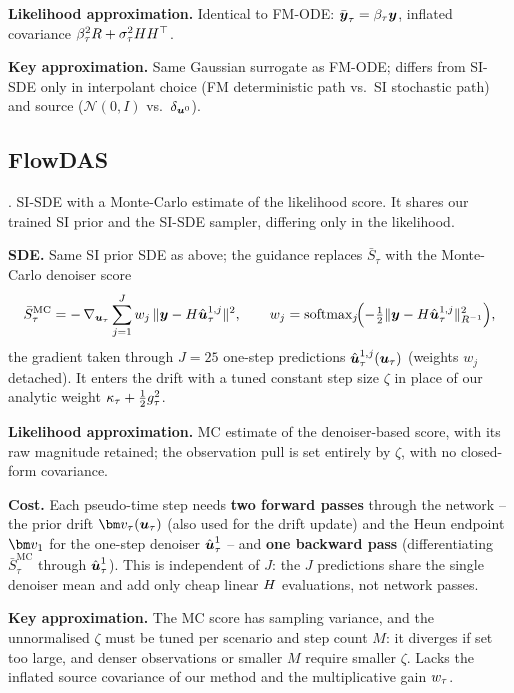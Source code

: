 \textbf{Likelihood approximation.}
Identical to FM-ODE: $\bar{\boldsymbol{y}}_\tau=\beta_\tau\boldsymbol{y}$, inflated covariance $\beta_\tau^2R+\sigma_\tau^2HH^\top$.

\textbf{Key approximation.}
Same Gaussian surrogate as FM-ODE; differs from SI-SDE only in interpolant choice (FM deterministic path vs.\ SI stochastic path) and source ($\mathcal{N}(0,I)$ vs.\ $\delta_{\boldsymbol{u}^0}$).

\subsection{FlowDAS}\label{appendix:method:flowdas}

\cite{chen_flowdas_2025}. SI-SDE with a Monte-Carlo estimate of the likelihood score. It shares our trained SI prior and the SI-SDE sampler, differing only in the likelihood.

\textbf{SDE.}
Same SI prior SDE as above; the guidance replaces $\bar S_\tau$ with the Monte-Carlo denoiser score
\begin{align}
  \bar S_\tau^{\mathrm{MC}}
  = -\,\nabla_{\boldsymbol{u}_\tau}\sum_{j=1}^{J} w_j\,\|\boldsymbol{y} - H\hat{\boldsymbol{u}}^{1,j}_\tau\|^2,
  \qquad
  w_j=\operatorname{softmax}_j\!\Bigl(-\tfrac12\|\boldsymbol{y}-H\hat{\boldsymbol{u}}^{1,j}_\tau\|_{R^{-1}}^2\Bigr),
\end{align}
the gradient taken through $J=25$ one-step predictions $\hat{\boldsymbol{u}}^{1,j}_\tau(\boldsymbol{u}_\tau)$ (weights $w_j$ detached). It enters the drift with a tuned constant step size $\zeta$ in place of our analytic weight $\kappa_\tau+\tfrac12g_\tau^2$.

\textbf{Likelihood approximation.}
MC estimate of the denoiser-based score, with its raw magnitude retained; the observation pull is set entirely by $\zeta$, with no closed-form covariance.

\textbf{Cost.}
Each pseudo-time step needs \textbf{two forward passes} through the network -- the prior drift $\fmvel_\tau(\state_\tau)$ (also used for the drift update) and the Heun endpoint $\fmvel_1$ for the one-step denoiser $\hat{\boldsymbol{u}}^1_\tau$ -- and \textbf{one backward pass} (differentiating $\bar S_\tau^{\mathrm{MC}}$ through $\hat{\boldsymbol{u}}^1_\tau$). This is independent of $J$: the $J$ predictions share the single denoiser mean and add only cheap linear $H$ evaluations, not network passes.

\textbf{Key approximation.}
The MC score has sampling variance, and the unnormalised $\zeta$ must be tuned per scenario and step count $M$: it diverges if set too large, and denser observations or smaller $M$ require smaller $\zeta$. Lacks the inflated source covariance of our method and the multiplicative gain $w_\tau$.

